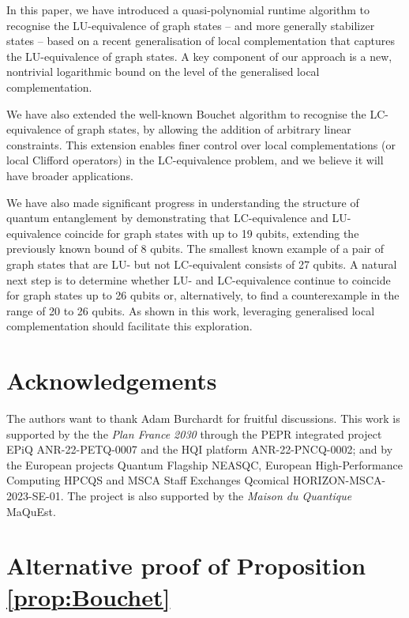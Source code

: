 \documentclass[a4paper,UKenglish,cleveref,autoref,thm-restate]{arxiv}
\begin{document}
In this paper, we have introduced a quasi-polynomial runtime algorithm to recognise the LU-equivalence of graph states -- and more generally stabilizer states -- based on a recent generalisation of local complementation that captures the LU-equivalence of graph states. A key component of our approach is a new, nontrivial logarithmic bound on the level of the generalised local complementation.

We have also extended the well-known Bouchet algorithm to recognise the LC-equivalence of graph states, by allowing the addition of arbitrary linear constraints. This extension enables finer control over local complementations (or local Clifford operators) in the LC-equivalence problem, and we believe it will have broader applications.

We have also made significant progress in understanding the structure of quantum entanglement by demonstrating that LC-equivalence and LU-equivalence coincide for graph states with up to 19 qubits, extending the previously known bound of 8 qubits. 
The smallest known example of a pair of graph states that are LU- but not LC-equivalent consists of 27 qubits. A natural next step is to determine whether LU- and LC-equivalence continue to coincide for graph states up to 26 qubits or, alternatively, to find a counterexample in the range of 20 to 26 qubits. As shown in this work, leveraging generalised local complementation should facilitate this exploration.

\section*{Acknowledgements}
The authors want to thank Adam Burchardt for fruitful discussions. This work is supported by the the \emph{Plan France 2030} through the PEPR integrated project EPiQ ANR-22-PETQ-0007 and the HQI platform ANR-22-PNCQ-0002; and by the European projects Quantum Flagship NEASQC, European High-Performance Computing HPCQS and MSCA Staff Exchanges Qcomical HORIZON-MSCA-2023-SE-01. The project is also supported by the \emph{Maison du Quantique} MaQuEst. 




\appendix

\section{Alternative proof of Proposition \ref{prop:Bouchet}}
\label{app:Bouchet}
\end{document}
